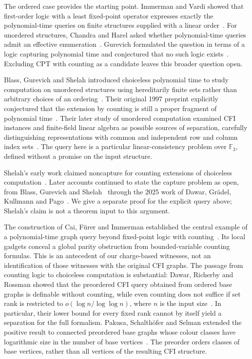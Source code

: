 The ordered case provides the starting point. Immerman and Vardi showed
that first-order logic with a least fixed-point operator expresses exactly
the polynomial-time queries on finite structures supplied with a linear
order~\cite{immerman1982,vardi1982}.
For unordered structures, Chandra and Harel asked whether polynomial-time
queries admit an effective enumeration~\cite[Section~5, p.~118]{chandraHarel1982}.
Gurevich formulated the question in terms of a logic capturing polynomial
time and conjectured that no such logic exists~\cite[Section~7]{gurevich1988}.
Excluding CPT with counting as a candidate leaves this broader question
open.

Blass, Gurevich and Shelah introduced choiceless polynomial time to study
computation on unordered structures using hereditarily finite sets rather
than arbitrary choices of an ordering~\cite{bgs1999}. Their original
1997 preprint explicitly conjectured that the extension by counting is
still a proper fragment of polynomial time~\cite[1997 version,
Introduction, p.~3]{bgs1999}. Their later study of unordered computation
examined CFI instances and finite-field linear algebra as possible sources
of separation, carefully distinguishing representations with common and
independent row and column index sets~\cite[Sections~4 and~6]{bgs2002}.
The query here is a particular linear-consistency problem over
$\mathbb F_3$, defined without a promise on the input structure.

Shelah's early work claimed noncapture for counting extensions of
choiceless computation~\cite[Introduction and Section~4]{shelah2000}.
Later accounts continued to state the capture problem as open, from
Blass, Gurevich and Shelah~\cite[Section~7]{bgs2002} through the 2025
work of Dawar, Gr{\"a}del, Kullmann and Pago~\cite[Section~2.2]{dawarGraedelKullmannPago2025}.
We give a separate proof for the explicit query above; Shelah's claim is
not a theorem input to this argument.

The construction of Cai, F{\"u}rer and Immerman established the central
example of a polynomial-time graph query beyond fixed-point logic with
counting~\cite{cfi1992}. Its local gadgets conceal a global parity
obstruction from bounded-variable counting formulas. This is an
antecedent of our charge-based witnesses, not an identification of those
witnesses with the original CFI graphs. The passage from counting logic
to choiceless computation is substantial: Dawar, Richerby and Rossman
showed that the preordered CFI query obtained from ordered base graphs is
definable without counting, while even counting does not suffice if set
rank is restricted to $o(\log n/\log\log n)$, where $n$ is the input
size~\cite[Theorems~17 and~40,
2007 author version]{drr2008}. In particular, their lower bound for every
fixed rank cannot by itself yield a separation for the full formalism.
Pakusa, Schalth{\"o}fer and Selman extended the positive result to
connected preordered base graphs whose colour classes have logarithmic
size in the number of base vertices~\cite[Theorem~1]{pakusaSchalthoeferSelman2016}.
The preorder orders classes of base vertices, rather than all vertices
of the resulting CFI structure.

